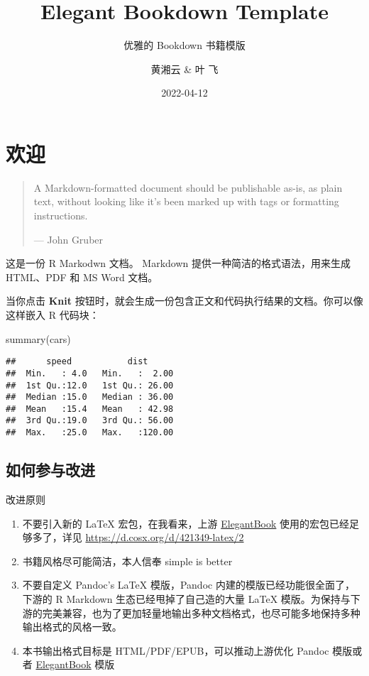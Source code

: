 \documentclass[
  lang=cn,
  11pt,
  scheme=chinese,
  chinesefont=nofont,
  citestyle=gb7714-2015,
  bibstyle=gb7714-2015]{elegantbook}
\institute{A bookdown wrapper for ElegantBook}
\title{Elegant Bookdown Template}
\subtitle{优雅的 Bookdown 书籍模版}
\author{黄湘云 \& 叶 飞}
\date{2022-04-12}
\newenvironment{Shaded}{\begin{snugshade}}{\end{snugshade}}
\newcommand{\FunctionTok}[1]{\textcolor[rgb]{0.00,0.00,0.00}{#1}}
\newcommand{\NormalTok}[1]{#1}
\providecommand{\tightlist}{%
  \setlength{\itemsep}{0pt}\setlength{\parskip}{0pt}}
\begin{document}
\maketitle

{
\hypersetup{linkcolor=Maroon}
\setcounter{tocdepth}{2}
\tableofcontents
}
\listoffigures
\listoftables
\mainmatter

\hypertarget{welcome}{%
\chapter{欢迎}\label{welcome}}

\begin{quote}
A Markdown-formatted document should be publishable as-is, as plain text, without looking like it's been marked up with tags or formatting instructions.

\hspace*{\fill} --- John Gruber
\end{quote}

这是一份 R Markodwn 文档。 Markdown 提供一种简洁的格式语法，用来生成 HTML、PDF 和 MS Word 文档。

当你点击 \textbf{Knit} 按钮时，就会生成一份包含正文和代码执行结果的文档。你可以像这样嵌入 R 代码块：

\begin{Shaded}
\begin{Highlighting}[]
\FunctionTok{summary}\NormalTok{(cars)}
\end{Highlighting}
\end{Shaded}

\begin{verbatim}
##      speed           dist       
##  Min.   : 4.0   Min.   :  2.00  
##  1st Qu.:12.0   1st Qu.: 26.00  
##  Median :15.0   Median : 36.00  
##  Mean   :15.4   Mean   : 42.98  
##  3rd Qu.:19.0   3rd Qu.: 56.00  
##  Max.   :25.0   Max.   :120.00
\end{verbatim}

\hypertarget{pr}{%
\section{如何参与改进}\label{pr}}

改进原则

\begin{enumerate}
\def\labelenumi{\arabic{enumi}.}
\tightlist
\item
  不要引入新的 LaTeX 宏包，在我看来，上游 \href{https://github.com/ElegantLaTeX/ElegantBook}{ElegantBook} 使用的宏包已经足够多了，详见 \url{https://d.cosx.org/d/421349-latex/2}
\item
  书籍风格尽可能简洁，本人信奉 simple is better
\item
  不要自定义 Pandoc's LaTeX 模版，Pandoc 内建的模版已经功能很全面了，下游的 R Markdown 生态已经甩掉了自己造的大量 LaTeX 模版。为保持与下游的完美兼容，也为了更加轻量地输出多种文档格式，也尽可能多地保持多种输出格式的风格一致。
\item
  本书输出格式目标是 HTML/PDF/EPUB，可以推动上游优化 Pandoc 模版或者 \href{https://github.com/ElegantLaTeX/ElegantBook}{ElegantBook} 模版
\end{enumerate}
\end{document}
